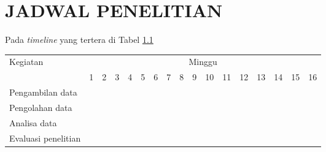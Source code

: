 \chapter{JADWAL PENELITIAN}

\newcommand{\w}{}
\newcommand{\G}{\cellcolor{gray}}

Pada \emph{timeline} yang tertera di Tabel \ref{tbl:timeline} \lipsum[10]

\begin{table}[H]
  \label{tbl:timeline}
  \begin{tabular}{|p{3.5cm}|c|c|c|c|c|c|c|c|c|c|c|c|c|c|c|c|}

    \hline
    \multirow{2}{*}{Kegiatan} & \multicolumn{16}{|c|}{Minggu}                                                                       \\
    \cline{2-17}              &
    1                         & 2                             & 3  & 4  & 5  & 6  & 7  & 8  & 9  & 10 & 11 & 12 & 13 & 14 & 15 & 16 \\
    \hline

    Pengambilan data          &
    \G                        & \G                            & \G & \G & \w & \w & \w & \w & \w & \w & \w & \w & \w & \w & \w & \w \\
    \hline

    Pengolahan data           &
    \w                        & \w                            & \w & \w & \G & \G & \G & \G & \w & \w & \w & \w & \w & \w & \w & \w \\
    \hline

    Analisa data              &
    \w                        & \w                            & \w & \w & \w & \w & \w & \w & \G & \G & \G & \G & \w & \w & \w & \w \\
    \hline

    Evaluasi penelitian       &
    \w                        & \w                            & \w & \w & \w & \w & \w & \w & \w & \w & \w & \w & \G & \G & \G & \G \\
    \hline
  \end{tabular}
\end{table}

